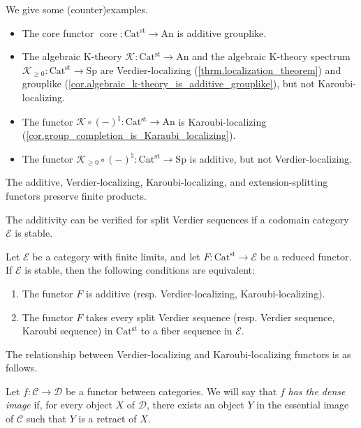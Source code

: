 \documentclass[a4paper,dvipdfmx,11pt,reqno]{amsart}
\DeclareMathOperator{\core}{core}
\newcommand{\C}{\mathcal{C}}
\newcommand{\D}{\mathcal{D}}
\newcommand{\E}{\mathcal{E}}
\newcommand{\K}{\mathcal{K}}
\newcommand{\An}{\mathrm{An}}
\newcommand{\Catst}{\mathrm{Cat^{st}}}
\newcommand{\Sp}{\mathrm{Sp}}
\begin{document}
\begin{example}
  We give some (counter)examples.
  \begin{itemize}
    \item The core functor $\core : \Catst \to \An$ is additive grouplike.
    \item The algebraic K-theory $\K : \Catst \to \An$ and the algebraic K-theory spectrum $\K_{\geq 0} : \Catst \to \Sp$ are Verdier-localizing (\cref{thrm.localization_theorem}) and grouplike (\cref{cor.algebraic_k-theory_is_additive_grouplike}), but not Karoubi-localizing.
    \item The functor $\K \circ (-)^{\natural} : \Catst \to \An$ is Karoubi-localizing (\cref{cor.group_completion_is_Karaubi_localizing}).
    \item The functor $\K_{\geq 0} \circ (-)^{\natural} : \Catst \to \Sp$ is additive, but not Verdier-localizing.
  \end{itemize}
\end{example}

\begin{proposition}
  The additive, Verdier-localizing, Karoubi-localizing, and extension-splitting functors preserve finite products.
\end{proposition}

The additivity can be verified for split Verdier sequences if a codomain category $\E$ is stable.

\begin{proposition}
  Let $\E$ be a category with finite limits, and let $F : \Catst \to \E$ be a reduced functor.
  If $\E$ is stable, then the following conditions are equivalent:
  \begin{enumerate}
    \item The functor $F$ is additive (resp. Verdier-localizing, Karoubi-localizing).
    \item The functor $F$ takes every split Verdier sequence (resp. Verdier sequence, Karoubi sequence) in $\Catst$ to a fiber sequence in $\E$.
  \end{enumerate}
\end{proposition}

The relationship between Verdier-localizing and Karoubi-localizing functors is as follows.

\begin{definition}
  Let $f : \C \to \D$ be a functor between categories.
  We will say that $f$ \textit{has the dense image} if, for every object $X$ of $\D$, there exists an object $Y$ in the essential image of $\C$ such that $Y$ is a retract of $X$. 
\end{definition}
\end{document}
